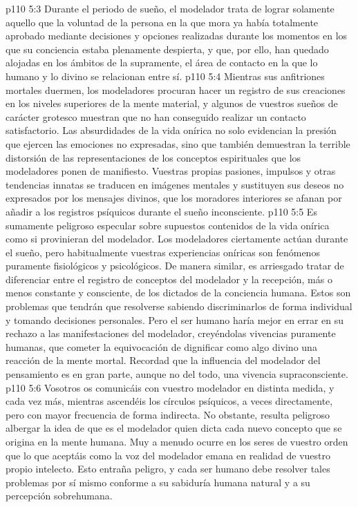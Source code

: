 \vs p110 5:3 Durante el periodo de sueño, el modelador trata de lograr solamente aquello que la voluntad de la persona en la que mora ya había totalmente aprobado mediante decisiones y opciones realizadas durante los momentos en los que su conciencia estaba plenamente despierta, y que, por ello, han quedado alojadas en los ámbitos de la supramente, el área de contacto en la que lo humano y lo divino se relacionan entre sí.
\vs p110 5:4 Mientras sus anfitriones mortales duermen, los modeladores procuran hacer un registro de sus creaciones en los niveles superiores de la mente material, y algunos de vuestros sueños de carácter grotesco muestran que no han conseguido realizar un contacto satisfactorio. Las absurdidades de la vida onírica no solo evidencian la presión que ejercen las emociones no expresadas, sino que también demuestran la terrible distorsión de las representaciones de los conceptos espirituales que los modeladores ponen de manifiesto. Vuestras propias pasiones, impulsos y otras tendencias innatas se traducen en imágenes mentales y sustituyen sus deseos no expresados por los mensajes divinos, que los moradores interiores se afanan por añadir a los registros psíquicos durante el sueño inconsciente.
\vs p110 5:5 Es sumamente peligroso especular sobre supuestos contenidos de la vida onírica como si provinieran del modelador. Los modeladores ciertamente actúan durante el sueño, pero habitualmente vuestras experiencias oníricas son fenómenos puramente fisiológicos y psicológicos. De manera similar, es arriesgado tratar de diferenciar entre el registro de conceptos del modelador y la recepción, más o menos constante y consciente, de los dictados de la conciencia humana. Estos son problemas que tendrán que resolverse sabiendo discriminarlos de forma individual y tomando decisiones personales. Pero el ser humano haría mejor en errar en su rechazo a las manifestaciones del modelador, creyéndolas vivencias puramente humanas, que cometer la equivocación de dignificar como algo divino una reacción de la mente mortal. Recordad que la influencia del modelador del pensamiento es en gran parte, aunque no del todo, una vivencia supraconsciente.
\vs p110 5:6 Vosotros os comunicáis con vuestro modelador en distinta medida, y cada vez más, mientras ascendéis los círculos psíquicos, a veces directamente, pero con mayor frecuencia de forma indirecta. No obstante, resulta peligroso albergar la idea de que es el modelador quien dicta cada nuevo concepto que se origina en la mente humana. Muy a menudo ocurre en los seres de vuestro orden que lo que aceptáis como la voz del modelador emana en realidad de vuestro propio intelecto. Esto entraña peligro, y cada ser humano debe resolver tales problemas por sí mismo conforme a su sabiduría humana natural y a su percepción sobrehumana.
